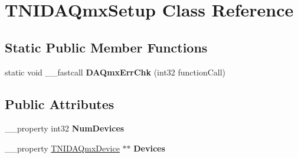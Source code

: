 \hypertarget{class_t_n_i_d_a_qmx_setup}{\section{T\+N\+I\+D\+A\+Qmx\+Setup Class Reference}
\label{class_t_n_i_d_a_qmx_setup}
}
\subsection*{Static Public Member Functions}
\begin{DoxyCompactItemize}
\item 
\hypertarget{class_t_n_i_d_a_qmx_setup_a48869266aab8fabb40b40c2c78b25761}{static void \+\_\+\+\_\+fastcall {\bfseries D\+A\+Qmx\+Err\+Chk} (int32 function\+Call)}\label{class_t_n_i_d_a_qmx_setup_a48869266aab8fabb40b40c2c78b25761}

\end{DoxyCompactItemize}
\subsection*{Public Attributes}
\begin{DoxyCompactItemize}
\item 
\+\_\+\+\_\+property int32 {\bfseries Num\+Devices}
\item 
\+\_\+\+\_\+property \hyperlink{class_t_n_i_d_a_qmx_device}{T\+N\+I\+D\+A\+Qmx\+Device} $\ast$$\ast$ {\bfseries Devices}
\end{DoxyCompactItemize}


